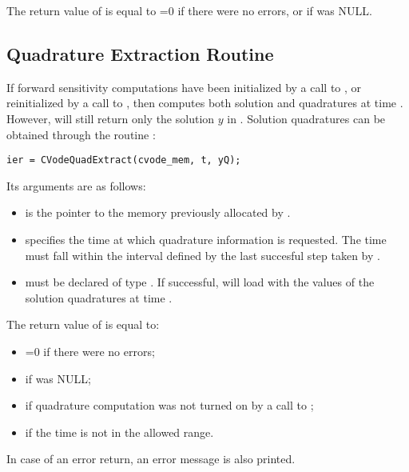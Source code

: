 The return value  of  is equal to =0 if
there were no errors, or  if  was NULL.  

\subsection{Quadrature Extraction Routine}\label{sss:cvodequadextract}

If forward sensitivity computations have been initialized by a call to ,
or reinitialized by a call to , then {\cvodes} computes both solution
and quadratures at time . However,  will still return only the solution
$y$ in . Solution quadratures can be obtained through the routine
:
\begin{verbatim}
ier = CVodeQuadExtract(cvode_mem, t, yQ);
\end{verbatim}
Its arguments are as follows:
\begin{itemize}
\item {} is the pointer to the memory previously allocated
  by .
\item {} specifies the time at which quadrature information is 
  requested. The time  must fall within the interval defined by the last 
  succesful step taken by {\cvodes}.
\item {} must be declared of type .
  If successful,  will load  with the values of the
  solution quadratures at time .
\end{itemize}
The return value  of  is equal to: 
\begin{itemize}
\item {}=0 if there were no errors; 
\item {} if  was NULL;
\item {} if quadrature computation was not turned on
      by a call to ;
\item {} if the time  is not in the allowed range.
\end{itemize}
In case of an error return, an error message is also printed.  



